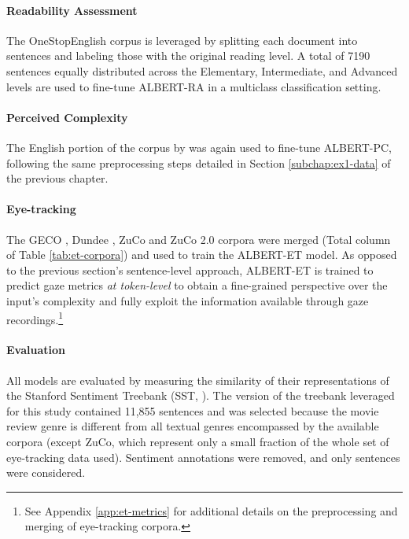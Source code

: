 \documentclass[a4paper, nobind]{templates/ociamthesis}
\begin{document}
\vspace{-12pt}

\paragraph{Readability Assessment} The OneStopEnglish corpus \autocite{vajjala-lucic-2018-onestopenglish} is leveraged by splitting each document into sentences and labeling those with the original reading level. A total of 7190 sentences equally distributed across the Elementary, Intermediate, and Advanced levels are used to fine-tune ALBERT-RA in a multiclass classification setting.

\vspace{-12pt}

\paragraph{Perceived Complexity} The English portion of the corpus by \textcite{brunato-etal-2018-sentence} was again used to fine-tune ALBERT-PC, following the same preprocessing steps detailed in Section \ref{subchap:ex1-data} of the previous chapter.

\vspace{-12pt}

\paragraph{Eye-tracking} The GECO \autocite{cop-etal-2017-presenting}, Dundee \autocite{kennedy-etal-2003-dundee}, ZuCo \autocite{hollenstein-2018-zuco} and ZuCo 2.0 \autocite{hollenstein-etal-2020-zuco} corpora were merged (Total column of Table \ref{tab:et-corpora}) and used to train the ALBERT-ET model. As opposed to the previous section's sentence-level approach, ALBERT-ET is trained to predict gaze metrics \emph{at token-level} to obtain a fine-grained perspective over the input's complexity and fully exploit the information available through gaze recordings.\footnote{See Appendix \ref{app:et-metrics} for additional details on the preprocessing and merging of eye-tracking corpora.}

\vspace{-12pt}

\paragraph{Evaluation} All models are evaluated by measuring the similarity of their representations of the Stanford Sentiment Treebank (SST, \textcite{socher-etal-2013-recursive}). The version of the treebank leveraged for this study contained 11,855 sentences and was selected because the movie review genre is different from all textual genres encompassed by the available corpora (except ZuCo, which represent only a small fraction of the whole set of eye-tracking data used). Sentiment annotations were removed, and only sentences were considered.
\end{document}
